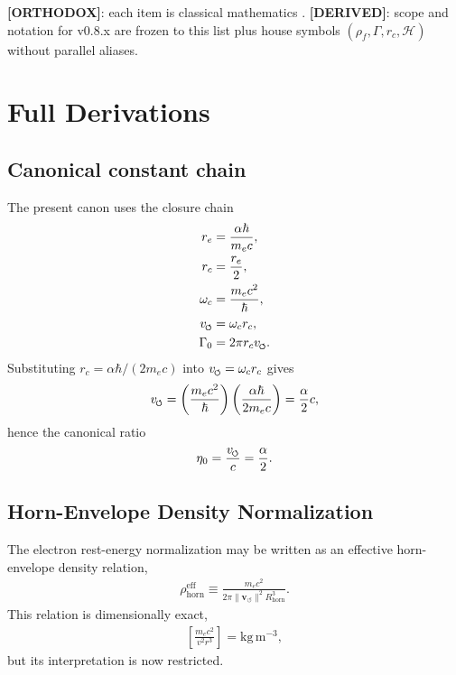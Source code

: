 \documentclass[11pt]{article}
\theoremstyle{definition}
\theoremstyle{plain}
\theoremstyle{remark}
\newcommand{\swirlarrow}{\mathchoice{\mkern-2mu\scriptstyle\boldsymbol{\circlearrowleft}}{\mkern-2mu\scriptstyle\boldsymbol{\circlearrowleft}}{\mkern-2mu\scriptscriptstyle\boldsymbol{\circlearrowleft}}{\mkern-2mu\scriptscriptstyle\boldsymbol{\circlearrowleft}}}
\newcommand{\rhoF}{{\rho_{\!f}}}
\newcommand{\rc}{{r_c}}
\newcommand{\vnorm}{\lVert \mathbf{v}_{\!\boldsymbol{\circlearrowleft}} \rVert}
\begin{document}
        \textbf{[ORTHODOX]}: each item is classical mathematics \cite{Moffatt1969,White1969,Batchelor1967}. \textbf{[DERIVED]}: scope and notation for v0.8.x are frozen to this list plus house symbols $(\rhoF,\Gamma,\rc,\mathcal{H})$ without parallel aliases.

    \section{Full Derivations}
        \label{sec:appendix_derivations}

        \subsection{Canonical constant chain}
            The present canon uses the closure chain
            \begin{align}
                r_e &= \frac{\alpha \hbar}{m_e c}, \\
                r_c &= \frac{r_e}{2}, \\
                \omega_c &= \frac{m_e c^2}{\hbar}, \\
                v_{\swirlarrow} &= \omega_c r_c, \\
                \Gamma_0 &= 2\pi r_c v_{\swirlarrow}.
            \end{align}
            Substituting $r_c = \alpha\hbar/(2m_e c)$ into $v_{\swirlarrow}=\omega_c r_c$ gives
            \begin{align}
                v_{\swirlarrow}
                =
                \left(\frac{m_e c^2}{\hbar}\right)
                \left(\frac{\alpha \hbar}{2m_e c}\right)
                = \frac{\alpha}{2}c,
            \end{align}
            hence the canonical ratio
            \begin{align}
                \eta_0 = \frac{v_{\swirlarrow}}{c} = \frac{\alpha}{2}.
            \end{align}

        \subsection{Horn-Envelope Density Normalization}
            The electron rest-energy normalization may be written as an effective horn-envelope density relation,
            \begin{align}
                \rho_{\mathrm{horn}}^{\mathrm{eff}}
                \equiv
                \frac{m_e c^2}{2\pi \vnorm^2 R_{\mathrm{horn}}^3}.
                \label{eq:rho_horn_eff}
            \end{align}
            This relation is dimensionally exact,
            \begin{align}
                \left[\frac{m_e c^2}{v^2 r^3}\right]
                =
                \mathrm{kg\,m^{-3}},
            \end{align}
            but its interpretation is now restricted.
\end{document}

